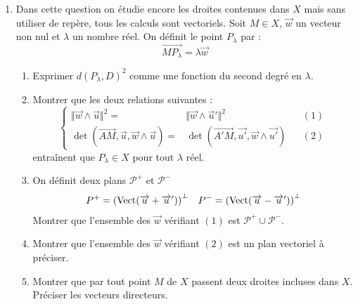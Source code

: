\begin{enumerate}
\item Dans cette question on étudie encore les droites contenues dans $X$ mais sans utiliser de repère, tous les calculs sont vectoriels.\newline
Soit $M\in X$, $\overrightarrow{w}$ un vecteur non nul et $\lambda$ un nombre réel. On définit le point $P_\lambda$ par :
\[\overrightarrow{MP_\lambda}=\lambda \overrightarrow{w}\]
\begin{enumerate}
\item Exprimer $d(P_\lambda,D)^2$ comme une fonction du second degré en $\lambda$.
\item Montrer que les deux relations suivantes :
\begin{displaymath}
\left\lbrace
  \begin{aligned}
\Vert \overrightarrow{w}\wedge \overrightarrow{u}\Vert^2 =& 
   \Vert\overrightarrow{w}\wedge \overrightarrow u'\Vert^2 & & (1)\\ 
\det(\overrightarrow{AM},\overrightarrow{u},\overrightarrow{w}\wedge\overrightarrow{u})  =&  \det(\overrightarrow{A'M},\overrightarrow{u'},\overrightarrow{w}\wedge\overrightarrow{u'}) & & (2) 
\end{aligned}
\right. 
\end{displaymath}
entraînent que $P_\lambda \in X$ pour tout $\lambda$ réel.
\item On définit deux plans $\mathcal P^+$ et $\mathcal P^-$ 
\begin{align*}
 P^+ =\left( \operatorname{Vect}(\overrightarrow u + \overrightarrow u')\right) ^\perp 
& & 
 P^- =\left( \operatorname{Vect}(\overrightarrow u - \overrightarrow u')\right) ^\perp
\end{align*}
Montrer que l'ensemble des $\overrightarrow{w}$ vérifiant $(1)$ est $\mathcal P^+ \cup \mathcal P^-$.
\item Montrer que l'ensemble des $\overrightarrow{w}$ vérifiant $(2)$ est un plan vectoriel à préciser.
\item Montrer que par tout point $M$ de $X$ passent deux droites incluses dans $X$. Préciser les vecteurs directeurs.
\end{enumerate}

\end{enumerate}